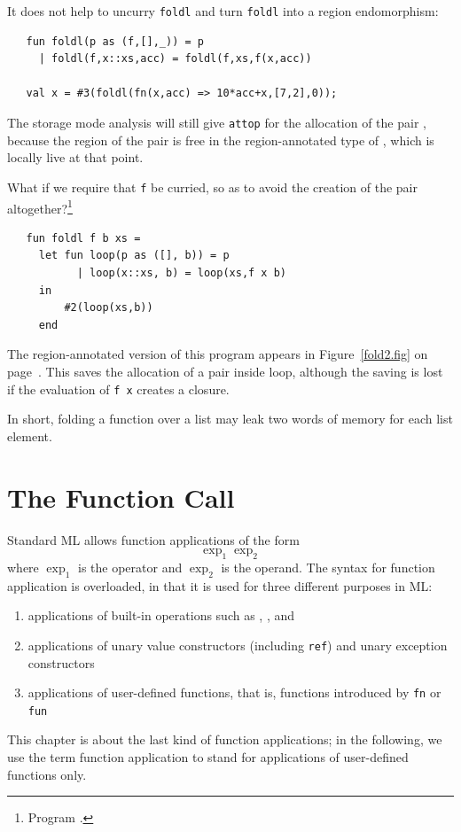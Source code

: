\documentclass[12pt]{book}
\begin{document}
It does not help to uncurry {\tt foldl} and turn {\tt foldl} into a
region endomorphism:
\begin{verbatim}
   fun foldl(p as (f,[],_)) = p
     | foldl(f,x::xs,acc) = foldl(f,xs,f(x,acc))

   val x = #3(foldl(fn(x,acc) => 10*acc+x,[7,2],0));
\end{verbatim}
The storage mode analysis will still give {\tt attop} for the
allocation of the pair , because the region of the pair
is free in the region-annotated type of , which is locally
live at that point.

What if we require that {\tt f} be curried, so as to avoid the
creation of the pair altogether?\footnote{Program
  .}
\begin{verbatim}
   fun foldl f b xs = 
     let fun loop(p as ([], b)) = p
           | loop(x::xs, b) = loop(xs,f x b)
     in
         #2(loop(xs,b))
     end
\end{verbatim}
The region-annotated version of this program appears in
Figure~\ref{fold2.fig} on page~\pageref{fold2.fig}. This saves the
allocation of a pair inside loop, although the saving is lost if the
evaluation of {\tt f x} creates a closure.

In short, folding a function over a list may leak two words of memory
for each list element.

\chapter{The Function Call}
Standard ML allows function applications of the form
$$\exp_1 \exp_2$$
where $\exp_1$ is the operator and $\exp_2$ is the
operand.  The syntax for function application is overloaded, in that
it is used for three different purposes in ML:
\begin{enumerate}
\item applications of built-in operations such as \boxml{+},
  \boxml{=}, and \boxml{:=}
\item applications of unary value constructors (including {\tt ref})
  and unary exception constructors
\item applications of user-defined functions, that is, functions
  introduced by {\tt fn} or {\tt fun}
\end{enumerate}
This chapter is about the last kind of function applications; in the
following, we use the term function application to stand for
applications of user-defined functions only.
\end{document}
